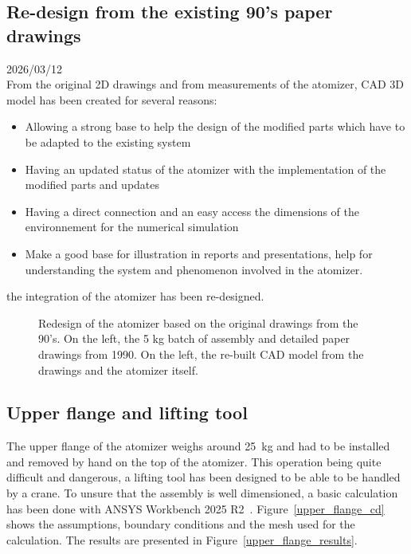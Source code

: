 \documentclass[../main.tex]{subfiles}
\begin{document}
\subsection{Re-design from the existing 90's paper drawings}

2026/03/12\\

From the original 2D drawings and from measurements of the atomizer, CAD 3D model has been created for several reasons:
\begin{itemize}
    \item Allowing a strong base to help the design of the modified parts which have to be adapted to the existing system
    \item Having an updated status of the atomizer with the implementation of the modified parts and updates
    \item Having a direct connection and an easy access the dimensions of the environnement for the numerical simulation
    \item Make a good base for illustration in reports and presentations, help for understanding the system and phenomenon involved in the atomizer.
\end{itemize}

the integration of the atomizer has been re-designed.

\vspace{0mm}
\begin{figure}[H]
    \centering
        
        \caption[Redesign of the atomizer based on the original drawings from the 90's.]{Redesign of the atomizer based on the original drawings from the 90's. On the left, the 5 kg batch of assembly and detailed paper drawings from 1990. On the left, the re-built CAD model from the drawings and the atomizer itself.}
        \label{redesign}
\end{figure}
\FloatBarrier
\vspace{0mm}


\subsection{Upper flange and lifting tool}

The upper flange of the atomizer weighs around 25~kg and had to be installed and removed by hand on the top of the atomizer. This operation being quite difficult and dangerous, a lifting tool has been designed to be able to be handled by a crane. To unsure that the assembly is well dimensioned, a basic calculation has been done with ANSYS Workbench 2025 R2~\cite{AnsysWorkbench}. Figure~\ref{upper_flange_cd} shows the assumptions, boundary conditions and the mesh used for the calculation. The results are presented in Figure~\ref{upper_flange_results}.
\end{document}
